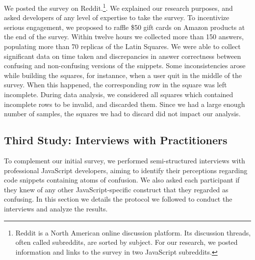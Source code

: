 We posted the survey on Reddit.\footnote{Reddit is a North American online discussion platform. Its discussion threads, often called subreddits, are sorted by subject. For our research, we posted information and links to the survey in two JavaScript subreddits.}. We explained our research purposes, and asked developers of any level of expertise to take the survey. To incentivize serious engagement, we proposed to raffle \$50 gift cards on Amazon products at the end of the survey. Within twelve hours we collected more than 150 answers, populating more than 70 replicas of the Latin Squares. We were able to collect significant data on time taken and discrepancies in answer correctness between confusing and non-confusing versions of the snippets. Some inconsistencies arose while building the squares, for instannce, when a user quit in the middle of the survey. When this happened, the corresponding row in the square was left incomplete. During data analysis, we considered all squares which contained incomplete rows to be invalid, and discarded them. Since we had a large enough number of samples, the squares we had to discard did not impact our analysis.
    
 
\subsection{Third Study: Interviews with Practitioners}

To complement our initial survey, we performed semi-structured interviews with professional JavaScript developers, aiming to identify their perceptions regarding code snippets containing atoms of confusion. We also asked each participant if they knew of any other JavaScript-specific construct that they regarded as confusing. In this section we details the protocol we followed to conduct the interviews and analyze the results.

